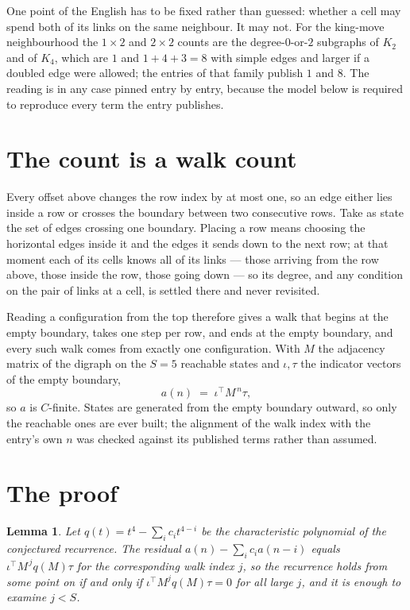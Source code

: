 \documentclass[11pt,a4paper]{article}
\theoremstyle{plain}
\newtheorem{lemma}[theorem]{Lemma}
\theoremstyle{definition}
\begin{document}
One point of the English has to be fixed rather than guessed: whether a cell may spend both of
its links on the same neighbour. It may not. For the king-move neighbourhood the $1\times2$
and $2\times2$ counts are the degree-$0$-or-$2$ subgraphs of $K_2$ and of $K_4$, which are $1$
and $1+4+3=8$ with simple edges and larger if a doubled edge were allowed; the entries of that
family publish $1$ and $8$. The reading is in any case pinned entry by entry, because the
model below is required to reproduce every term the entry publishes.


\section{The count is a walk count}

Every offset above changes the row index by at most one, so an edge either lies inside a row
or crosses the boundary between two consecutive rows. Take as state the set of edges crossing
one boundary. Placing a row means choosing the horizontal edges inside it and the edges it
sends down to the next row; at that moment each of its cells knows all of its links --- those
arriving from the row above, those inside the row, those going down --- so its degree, and any
condition on the pair of links at a cell, is settled there and never revisited.

Reading a configuration from the top therefore gives a walk that begins at the empty boundary,
takes one step per row, and ends at the empty boundary, and every such walk comes from exactly
one configuration. With $M$ the adjacency matrix of the digraph on the $S=5$ reachable
states and $\iota,\tau$ the indicator vectors of the empty boundary,
\[
a(n)\;=\;\iota^{\!\top}M^{\,n}\tau ,
\]
so $a$ is $C$-finite. States are generated from the empty boundary outward, so only the
reachable ones are ever built; the alignment of the walk index with the entry's own $n$ was
checked against its published terms rather than assumed.

\section{The proof}

\begin{lemma}\label{lem:crit}
Let $q(t)=t^{4}-\sum_i c_it^{4-i}$ be the characteristic polynomial of the
conjectured recurrence. The residual $a(n)-\sum_ic_ia(n-i)$ equals
$\iota^{\!\top}M^{\,j}q(M)\tau$ for the corresponding walk index $j$, so the recurrence
holds from some point on if and only if $\iota^{\!\top}M^{j}q(M)\tau=0$ for all large $j$,
and it is enough to examine $j<S$.
\end{lemma}
\end{document}
